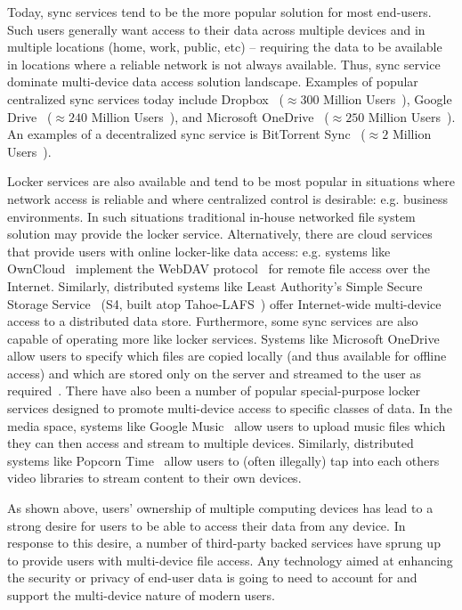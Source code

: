 Today, sync services tend to be the more popular solution for most
end-users. Such users generally want access to their data across
multiple devices and in multiple locations (home, work, public,
etc) -- requiring the data to be available in locations where a
reliable network is not always available. Thus, sync service dominate
multi-device data access solution landscape. Examples of popular
centralized sync services today include Dropbox~\cite{dropbox}
($\approx300$ Million Users~\cite{smith-stats}), Google
Drive~\cite{google-drive} ($\approx240$ Million
Users~\cite{smith-stats}), and Microsoft
OneDrive~\cite{microsoft-onedrive} ($\approx250$ Million
Users~\cite{smith-stats}).  An examples of a decentralized sync
service is BitTorrent Sync~\cite{bittorrent-sync} ($\approx2$ Million
Users~\cite{smith-stats}).

Locker services are also available and tend to be most popular in
situations where network access is reliable and where centralized
control is desirable: e.g. business environments. In such situations
traditional in-house networked file system solution may provide the
locker service. Alternatively, there are cloud services that provide
users with online locker-like data access: e.g. systems like
OwnCloud~\cite{owncloud} implement the WebDAV
protocol~\cite{goland1999} for remote file access over the
Internet. Similarly, distributed systems like Least Authority's Simple
Secure Storage Service~\cite{leastauthority-s4} (S4, built atop
Tahoe-LAFS~\cite{wilcox-o'hearn2008}) offer Internet-wide multi-device
access to a distributed data store. Furthermore, some sync services
are also capable of operating more like locker services. Systems like
Microsoft OneDrive allow users to specify which files are copied
locally (and thus available for offline access) and which are stored
only on the server and streamed to the user as
required~\cite{microsoft-onedrive-online}. There have also been a
number of popular special-purpose locker services designed to promote
multi-device access to specific classes of data. In the media space,
systems like Google Music~\cite{google-music} allow users to upload
music files which they can then access and stream to multiple
devices. Similarly, distributed systems like Popcorn
Time~\cite{popcorntime} allow users to (often illegally) tap into each
others video libraries to stream content to their own devices.

As shown above, users' ownership of multiple computing devices has
lead to a strong desire for users to be able to access their data from
any device. In response to this desire, a number of third-party backed
services have sprung up to provide users with multi-device file
access. Any technology aimed at enhancing the security or privacy of
end-user data is going to need to account for and support the
multi-device nature of modern users.

